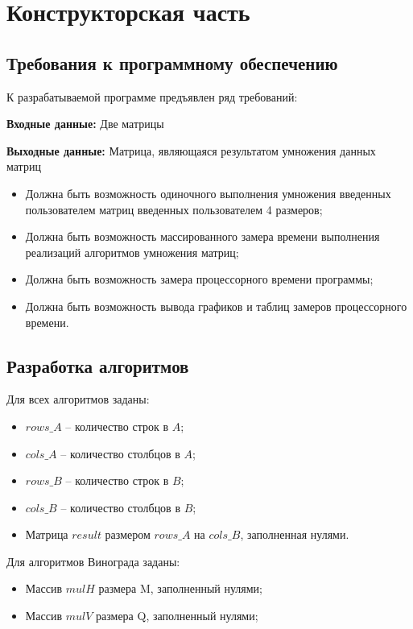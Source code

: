 \chapter{Конструкторская часть}

\section{Требования к программному обеспечению}

К разрабатываемой программе предъявлен ряд требований:

\textbf{Входные данные:} Две матрицы

\textbf{Выходные данные:} Матрица, являющаяся результатом умножения данных матриц

\begin{itemize}
    \item Должна быть возможность одиночного выполнения умножения введенных пользователем матриц введенных пользователем 4 размеров;
    \item Должна быть возможность массированного замера времени выполнения реализаций алгоритмов умножения матриц;
    \item Должна быть возможность замера процессорного времени программы;
    \item Должна быть возможность вывода графиков и таблиц замеров процессорного времени.
\end{itemize}

\section{Разработка алгоритмов}

Для всех алгоритмов заданы:
\begin{itemize}
    \item $rows\_A$ -- количество строк в $A$;
    \item $cols\_A$ -- количество столбцов в $A$;
    \item $rows\_B$ -- количество строк в $B$;
    \item $cols\_B$ -- количество столбцов в $B$;
    \item Матрица $result$ размером $rows\_A$ на $cols\_B$, заполненная нулями.
\end{itemize}

Для алгоритмов Винограда заданы:
\begin{itemize}
    \item Массив $mulH$ размера M, заполненный нулями;
    \item Массив $mulV$ размера Q, заполненный нулями;
\end{itemize}

